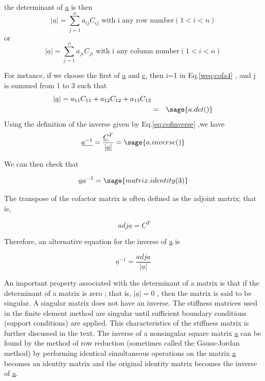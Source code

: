 \documentclass[12pt]{report}
\newcommand{\lab}[1]{
	Eq.\ref{#1}
}
\begin{document}
the determinant of \underline{a} is then 
\begin{equation}
	{|\underline{a}|}=\sum_{j=1}^{n}a_{ij}C_{ij} 
	\text{ with i any row number} 
	(1 < i < n)
	\label{weq:cofa4}
\end{equation}
or
\begin{equation}
	{|\underline{a}|}=\sum_{j=1}^{n}a_{ji}C_{ji} 
	\text{ with i any column number}(1 < i < n) 
\end{equation} 

For instance, if we choose the first of \underline{a} and \underline{c}, then i=1
in \lab{weq:cofa4}, and j is summed from 1 to 3 such that
\begin{eqnarray}
	|\underline{a}|=a_{11}C_{11}+a_{12}C_{12}+a_{13}C_{13} \nonumber \\ 
	& = & \sage{a.det()}
\end{eqnarray}
Using the definition of the inverse given by \lab{eq:cofinverse},we have
\begin{equation} 
	\underline{a^{-1}}=\frac{\underline{C}^T}{|\underline{a}|}=\sage{a.inverse()} 
\end{equation}

We can then check that

\begin{equation}
	\underline{a}{a}^{-1}=\sage{matrix.identity(3)}
\end{equation}


The transpose of the cofactor matrix is often defined as the adjoint
matrix; that is,

\begin{equation}
	\ adj\underline{a}=\underline{C}^T 
\end{equation}

Therefore, an alternative equation for the inverse of \underline{a} is


\begin{equation}
	\underline{a}^{-1}=\frac {adj \underline{a}}{|\underline{a}|}
\end{equation}


An important property associated with the determinant of a matrix is
that if the determinant of a matrix is zero ; that is,
$|\underline{a}| =0$ , then the matrix is said to be singular. A
singular matrix does not have an inverse. The stiffness matrices used
in the finite element method are singular until sufficient boundary
conditions (support conditions) are applied. This characteristics of
the stiffness matrix is further discussed in the text.
The inverse of a nonsingular square matrix \underline{a} can be found
by the method of row reduction (sometimes called the Gauss-Jordan
method) by performing identical simultaneous operations on the matrix
\underline{a} becomes an identity matrix and the original identity
matrix becomes the inverse of \underline{a}.
\end{document}
